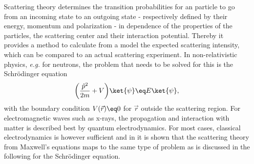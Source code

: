 \documentclass[\main/dresen_thesis.tex]{subfiles}
\begin{document}
    Scattering theory determines the transition probabilities for an particle to go from an incoming state to an outgoing state - respectively defined by their energy, momentum and polarization - in dependence of the properties of the particles, the scattering center and their interaction potential.
    Thereby it provides a method to calculate from a model the expected scattering intensity, which can be compared to an actual scattering experiment.
    In non-relativistic physics, \textit{e.g.} for neutrons, the problem that needs to be solved for this is the Schr\"odinger equation
    \begin{align}
      \label{eq:theoreticalBackground:scattering:scatteringTheory:schrodingerEquation}
      \bigg(\frac{\hat{p}^2}{2m} + V \bigg) \ket{\psi} \eq E \ket{\psi},
    \end{align}
    with the boundary condition $V(\vec{r}) \eq 0$ for $\vec{r}$ outside the scattering region.
    For electromagnetic waves such as x-rays, the propagation and interaction with matter is described best by quantum electrodynamics.
    For most cases, classical electrodynamics is however sufficient and in  it is shown that the scattering theory from Maxwell's equations maps to the same type of problem as is discussed in the following for the Schr\"odinger equation.
\end{document}
